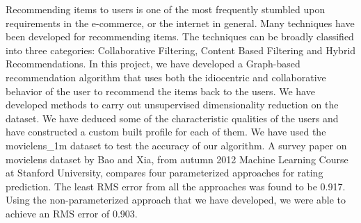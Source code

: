 \documentclass{report}
\begin{document}
\begin{projectAbstract}

        Recommending items to users is one of the most frequently stumbled upon requirements in the e-commerce, or the internet in general. Many techniques have been developed for recommending items. The techniques can be broadly classified into three categories: Collaborative Filtering, Content Based Filtering and Hybrid Recommendations. In this project, we have developed a Graph-based recommendation algorithm that uses both the idiocentric and collaborative behavior of the user to recommend the items back to the users. We have developed methods to carry out unsupervised dimensionality reduction on the dataset. We have deduced some of the characteristic qualities of the users and have constructed a custom built profile for each of them. We have used the movielens\_1m dataset to test the accuracy of our algorithm. A survey paper on movielens dataset by Bao and Xia, from autumn 2012 Machine Learning Course at Stanford University, compares four parameterized approaches for rating prediction. The least RMS error from all the approaches was found to be 0.917. Using the non-parameterized approach that we have developed, we were able to achieve an RMS error of 0.903.
    
\end{projectAbstract}




\newpage
\tableofcontents
\newpage
\end{document}
